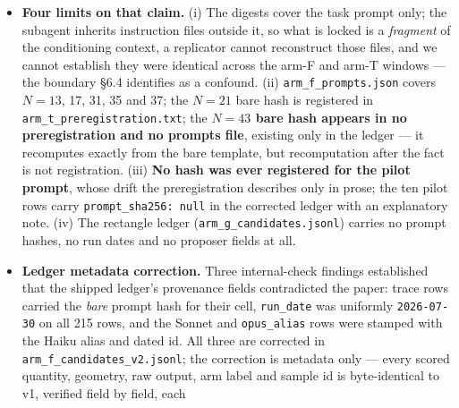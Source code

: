 \begin{itemize}
  (\texttt{arm\_pp\_preregistration.txt}, prompt hashes and scorer committed, \texttt{2e89614},
  pushed before the first invocation) discloses that its paraphrases were authored results-aware.
  The rectangle transfer was registered before
  collection and never refitted. On multiplicity: this study now spans many registered arms, and no
  correction across arms is applied --- each arm's predictions were registered with its own
  bars and falsifiers before its sampling, every arm is reported regardless of outcome
  (three GM-chain instruments failed or stalled before one succeeded, and \S3.4's falsifier
  fired), and no arm was selected for inclusion on its result. The protection against
  garden-of-forking-paths here is registration and exhaustive reporting, not a family-wise
  error rate; a reader who wants one can count arms from this section.
\item \textbf{Four limits on that claim.} (i) The digests cover the task prompt only; the subagent
  inherits instruction files outside it, so what is locked is a \emph{fragment} of the conditioning
  context, a replicator cannot reconstruct those files, and we cannot establish they were
  identical across the arm-F and arm-T windows --- the boundary \S6.4 identifies as a confound.
  (ii) \texttt{arm\_f\_prompts.json} covers $N = 13$, 17, 31, 35 and 37; the $N = 21$ bare hash is registered
  in \texttt{arm\_t\_preregistration.txt}; the \textbf{$N = 43$ bare hash appears in no preregistration and no
  prompts file}, existing only in the ledger --- it recomputes exactly from the bare template, but
  recomputation after the fact is not registration. (iii) \textbf{No hash was ever registered for the
  pilot prompt}, whose drift the preregistration describes only in prose; the ten pilot rows
  carry \texttt{prompt\_sha256: null} in the corrected ledger with an explanatory note. (iv) The
  rectangle ledger (\texttt{arm\_g\_candidates.jsonl}) carries no prompt hashes, no run dates and no
  proposer fields at all.
\item \textbf{Ledger metadata correction.} Three internal-check findings established that the shipped ledger's
  provenance fields contradicted the paper: trace rows carried the \emph{bare} prompt hash for their
  cell, \texttt{run\_date} was uniformly \texttt{2026-07-30} on all 215 rows, and the Sonnet and \texttt{opus\_alias}
  rows were stamped with the Haiku alias and dated id. All three are corrected in
  \texttt{arm\_f\_candidates\_v2.jsonl}; the correction is metadata only --- every scored quantity, geometry,
  raw output, arm label and sample id is byte-identical to v1, verified field by field, each

\end{itemize}
